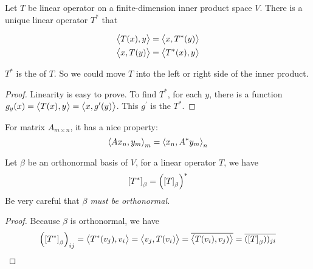 \begin{theorem}\label{adjoint_operator_definition}
    Let $T$ be linear operator on a finite-dimension inner product space $V$. There is a unique linear operator $T^*$ that
    
    \begin{equation}
        \begin{aligned}
            \innerproduct{T(x)}{y} &= \innerproduct{x}{T^* (y)} \\
            \innerproduct{x}{T(y)} &= \innerproduct{T^* (x)}{y}
        \end{aligned}
    \end{equation}
    
    
    $T^*$ is the  of $T$. So we could move $T$ into the left or right side of the inner product.
\end{theorem}
\begin{proof}
    Linearity is easy to prove. To find $T^*$, for each $y$, there is a function $g_y (x) = \innerproduct{T(x)}{y} = \innerproduct{x}{g^\prime (y)}$. This $g^\prime$ is the $T^*$.
\end{proof}


For matrix $A_{m \times n}$, it has a nice property:
\begin{equation}
    \innerproduct{A x_n}{y_m}_m = \innerproduct{x_n}{A^* y_m}_n
\end{equation}

\begin{theorem}\label{operator_conjugate_transpose_requirement}
    Let $\beta$ be an orthonormal basis of $V$, for a linear operator $T$, we have
    \begin{equation}
        \coordinate{T^*}_\beta = \mleft(\coordinate{T}_\beta\mright)^*
    \end{equation}
    Be very careful that \emph{$\beta$ must be orthonormal.}
\end{theorem}
\begin{proof}
    Because $\beta$ is orthonormal, we have
    \begin{equation*}
        \mleft(\coordinate{T^*}_\beta\mright)_{ij} = \innerproduct{T^* (v_j)}{v_i} = \innerproduct{v_j}{T(v_i)} = \conjugate{\innerproduct{T(v_i)}{v_j)}} = \conjugate{(\coordinate{T}_\beta))_{ji}}
    \end{equation*}
\end{proof}



